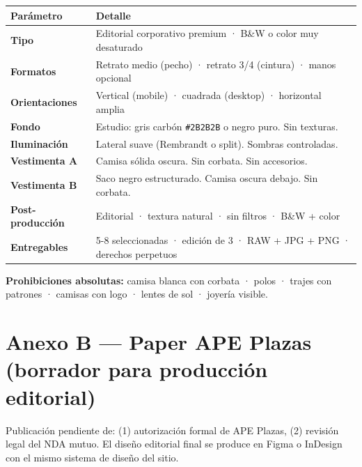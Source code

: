 \documentclass[11pt, a4paper]{article}
\begin{document}
\begin{table}[h]
\centering
\begin{tabularx}{\linewidth}{>{\bfseries}l X}
\toprule
Parámetro & Detalle \\
\midrule
Tipo & Editorial corporativo premium · B\&W o color muy desaturado \\
Formatos & Retrato medio (pecho) · retrato 3/4 (cintura) · manos opcional \\
Orientaciones & Vertical (mobile) · cuadrada (desktop) · horizontal amplia \\
Fondo & Estudio: gris carbón \texttt{\#2B2B2B} o negro puro. Sin texturas. \\
Iluminación & Lateral suave (Rembrandt o split). Sombras controladas. \\
Vestimenta A & Camisa sólida oscura. Sin corbata. Sin accesorios. \\
Vestimenta B & Saco negro estructurado. Camisa oscura debajo. Sin corbata. \\
Post-producción & Editorial · textura natural · sin filtros · B\&W + color \\
Entregables & 5-8 seleccionadas · edición de 3 · RAW + JPG + PNG · derechos perpetuos \\
\bottomrule
\end{tabularx}
\end{table}

\textbf{Prohibiciones absolutas:} camisa blanca con corbata · polos · trajes con
patrones · camisas con logo · lentes de sol · joyería visible.

\newpage


\section*{Anexo B — Paper APE Plazas (borrador para producción editorial)}

\begin{pendiente}
Publicación pendiente de: (1) autorización formal de APE Plazas,
(2) revisión legal del NDA mutuo. El diseño editorial final se produce en
Figma o InDesign con el mismo sistema de diseño del sitio.
\end{pendiente}

\vspace{1em}
\end{document}
